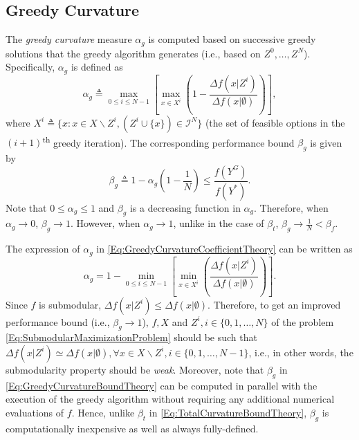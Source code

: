 \documentclass[letterpaper, 10 pt, conference]{ieeeconf}
\newcommand{\tsup}[1]{\textsuperscript{#1}}
\begin{document}
{\subsection{Greedy Curvature \cite{Conforti1984}}
\label{SubSec:GreedyCurvature}



The \emph{greedy curvature} measure $\alpha_g$ is computed based on successive greedy solutions that the greedy algorithm generates (i.e., based on $Z^0,\ldots,Z^N$). Specifically, $\alpha_g$ is defined as   
\begin{equation}\label{Eq:GreedyCurvatureCoefficientTheory}
    \alpha_g \triangleq \max_{0 \leq i \leq N-1} \left[ \max_{x \in X^i}\left(1 - \frac{\Delta f(x\vert Z^i)}{\Delta f(x\vert \emptyset)}\right) \right],
\end{equation}
where $X^i \triangleq \{x: x \in X \backslash Z^i, (Z^i \cup \{x\}) \in \mathcal{I}^N\}$ (the set of feasible options in the $(i+1)$\tsup{th} greedy iteration). The corresponding performance bound $\beta_g$ is given by  
\begin{equation}\label{Eq:GreedyCurvatureBoundTheory}
    \beta_g \triangleq 1-\alpha_g\left(1-\frac{1}{N}\right) \leq \frac{f(Y^G)}{f(Y^*)}. 
\end{equation}
Note that $0 \leq \alpha_g \leq 1$ and $\beta_g$ is a decreasing function in $\alpha_g$. Therefore, when $\alpha_g \rightarrow 0$, $\beta_g \rightarrow 1$. However, when $\alpha_g \rightarrow 1$, unlike in the case of $\beta_t$,  $\beta_g \rightarrow \frac{1}{N} < \beta_f$. 


The expression of $\alpha_g$ in \eqref{Eq:GreedyCurvatureCoefficientTheory} can be written as
\begin{equation*}
    \alpha_g = 1 - \min_{0 \leq i \leq N-1} \left[ \min_{x \in X^i}\left(\frac{\Delta f(x\vert Z^i)}{\Delta f(x\vert \emptyset)}\right) \right].
\end{equation*}
Since $f$ is submodular, $\Delta f(x\vert Z^i) \leq \Delta f(x\vert \emptyset)$. Therefore, to get an improved performance bound (i.e., $\beta_g\rightarrow 1$), $f, X$ and $Z^i, i \in \{0,1,\ldots,N\}$ of the problem \eqref{Eq:SubmodularMaximizationProblem} should be such that $\Delta f(x\vert Z^i) \simeq \Delta f(x\vert \emptyset), \forall x \in X\backslash Z^i, i \in \{0,1,\ldots,N-1\}$, i.e., in other words, the submodularity property should be \emph{weak}. Moreover, note that $\beta_g$ in \eqref{Eq:GreedyCurvatureBoundTheory} can be computed in parallel with the execution of the greedy algorithm without requiring any additional numerical evaluations of $f$. Hence, unlike $\beta_t$ in \eqref{Eq:TotalCurvatureBoundTheory}, $\beta_g$ is computationally inexpensive as well as always fully-defined. 


}
\end{document}
